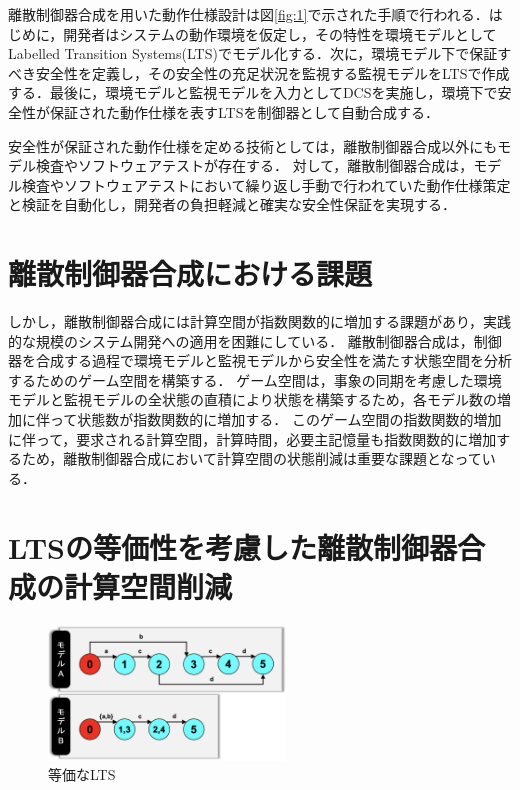 \documentclass[11pt]{jarticle}
\begin{document}
離散制御器合成を用いた動作仕様設計は図\ref{fig:1}で示された手順で行われる\cite{concurrency}．はじめに，開発者はシステムの動作環境を仮定し，その特性を環境モデルとしてLabelled Transition Systems(LTS)でモデル化する．次に，環境モデル下で保証すべき安全性を定義し，その安全性の充足状況を監視する監視モデルをLTSで作成する．最後に，環境モデルと監視モデルを入力としてDCSを実施し，環境下で安全性が保証された動作仕様を表すLTSを制御器として自動合成する．

安全性が保証された動作仕様を定める技術としては，離散制御器合成以外にもモデル検査やソフトウェアテストが存在する．
対して，離散制御器合成は，モデル検査やソフトウェアテストにおいて繰り返し手動で行われていた動作仕様策定と検証を自動化し，開発者の負担軽減と確実な安全性保証を実現する．


\section{離散制御器合成における課題}
しかし，離散制御器合成には計算空間が指数関数的に増加する課題があり，実践的な規模のシステム開発への適用を困難にしている．
離散制御器合成は，制御器を合成する過程で環境モデルと監視モデルから安全性を満たす状態空間を分析するためのゲーム空間を構築する．
ゲーム空間は，事象の同期を考慮した環境モデルと監視モデルの全状態の直積により状態を構築するため，各モデル数の増加に伴って状態数が指数関数的に増加する．
このゲーム空間の指数関数的増加に伴って，要求される計算空間，計算時間，必要主記憶量も指数関数的に増加するため，離散制御器合成において計算空間の状態削減は重要な課題となっている．


\section{LTSの等価性を考慮した離散制御器合成の計算空間削減}
\begin{figure}
  \centering
  \includegraphics[width=6.3cm]{./figures/minimise.png}
  \caption{等価なLTS}
  \label{fig:2}
\end{figure}
\end{document}
